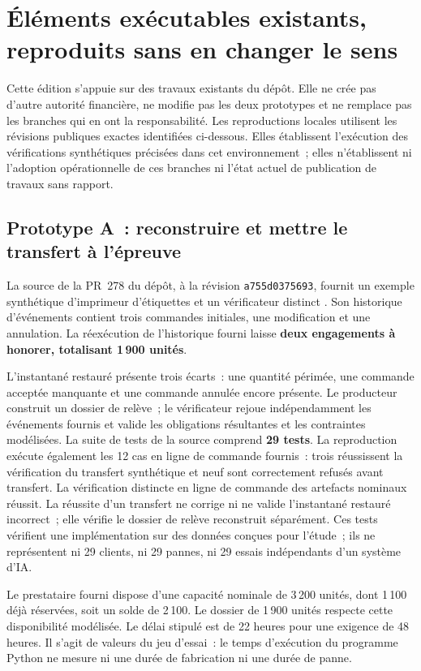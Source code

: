 \documentclass[11pt,a4paper]{article}
\begin{document}
\section{Éléments exécutables existants, reproduits sans en changer le sens}\label{sec:evidence}
Cette édition s’appuie sur des travaux existants du dépôt. Elle ne crée pas d’autre autorité financière, ne modifie pas les deux prototypes et ne remplace pas les branches qui en ont la responsabilité. Les reproductions locales utilisent les révisions publiques exactes identifiées ci-dessous. Elles établissent l’exécution des vérifications synthétiques précisées dans cet environnement~; elles n’établissent ni l’adoption opérationnelle de ces branches ni l’état actuel de publication de travaux sans rapport.

\subsection{Prototype A~: reconstruire et mettre le transfert à l’épreuve}
La source de la PR~278 du dépôt, à la révision \texttt{a755d0375693}, fournit un exemple synthétique d’imprimeur d’étiquettes et un vérificateur distinct \cite{handoffSource}. Son historique d’événements contient trois commandes initiales, une modification et une annulation. La réexécution de l’historique fourni laisse \textbf{deux engagements à honorer, totalisant 1\,900 unités}.

L’instantané restauré présente trois écarts~: une quantité périmée, une commande acceptée manquante et une commande annulée encore présente. Le producteur construit un dossier de relève~; le vérificateur rejoue indépendamment les événements fournis et valide les obligations résultantes et les contraintes modélisées. La suite de tests de la source comprend \textbf{29 tests}. La reproduction exécute également les 12 cas en ligne de commande fournis~: trois réussissent la vérification du transfert synthétique et neuf sont correctement refusés avant transfert. La vérification distincte en ligne de commande des artefacts nominaux réussit. La réussite d’un transfert ne corrige ni ne valide l’instantané restauré incorrect~; elle vérifie le dossier de relève reconstruit séparément. Ces tests vérifient une implémentation sur des données conçues pour l’étude~; ils ne représentent ni 29 clients, ni 29 pannes, ni 29 essais indépendants d’un système d’IA.

Le prestataire fourni dispose d’une capacité nominale de 3\,200 unités, dont 1\,100 déjà réservées, soit un solde de 2\,100. Le dossier de 1\,900 unités respecte cette disponibilité modélisée. Le délai stipulé est de 22 heures pour une exigence de 48 heures. Il s’agit de valeurs du jeu d’essai~: le temps d’exécution du programme Python ne mesure ni une durée de fabrication ni une durée de panne.
\end{document}
